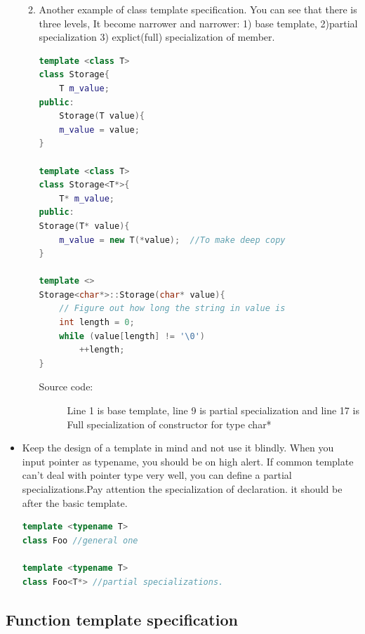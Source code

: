 \documentclass[a4paper,11pt,twoside]{book}
\begin{document}
\begin{itemize}
\begin{enumerate}
\begin{enumerate}
		\end{enumerate}
	
		\item Another example of class template specification. You can see that there is three levels, It become narrower and narrower: 1) base template, 2)partial specialization 3) explict(full) specialization of member.
\begin{lstlisting}[frame=single, language=c++]
template <class T>
class Storage{
	T m_value;
public:
	Storage(T value){
	m_value = value;
}

template <class T>
class Storage<T*>{
	T* m_value;
public:
Storage(T* value){
	m_value = new T(*value);  //To make deep copy
}

template <>
Storage<char*>::Storage(char* value){
	// Figure out how long the string in value is
	int length = 0;
	while (value[length] != '\0')
		++length;
}
\end{lstlisting}
\begin{description}
	\item[Source code:] Line 1 is base template, line 9 is partial specialization and line 17 is Full specialization of constructor for type char* 
\end{description}

\end{enumerate}

    \item Keep the design of a template in mind and not use it blindly. When you input pointer as typename, you should be on high alert. If common template can't deal with pointer type very well, you can define a partial specializations.Pay attention the specialization of declaration. it should be after the basic template.

\begin{lstlisting}[frame=single, language=c++]
template <typename T>
class Foo //general one

template <typename T>
class Foo<T*> //partial specializations.
\end{lstlisting}

\end{itemize}

\subsection{Function template specification}
\end{document}
